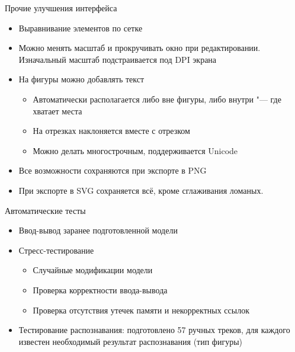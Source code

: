 \documentclass[utf8,xcolor=table]{beamer}
\begin{document}
\begin{frame}[t]{Прочие улучшения интерфейса}
  \begin{itemize}
  \item Выравнивание элементов по сетке
  \item Можно менять масштаб и прокручивать окно при редактировании. Изначальный масштаб подстраивается под DPI экрана
  \item На фигуры можно добавлять текст
    \begin{itemize}
    \item Автоматически располагается либо вне фигуры, либо внутри "--- где хватает места
    \item На отрезках наклоняется вместе с отрезком
    \item Можно делать многострочным, поддерживается Unicode
    \end{itemize}
  \item Все возможности сохраняются при экспорте в PNG
  \item При экспорте в SVG сохраняется всё, кроме сглаживания ломаных.
  \end{itemize}
\end{frame}

\begin{frame}[t]{Автоматические тесты}
  \begin{itemize}
  \item Ввод-вывод заранее подготовленной модели
  \item Стресс-тестирование
    \begin{itemize}
    \item Случайные модификации модели
    \item Проверка корректности ввода-вывода
    \item Проверка отсутствия утечек памяти и некорректных ссылок
    \end{itemize}
  \item Тестирование распознавания: подготовлено 57 ручных треков, для каждого известен необходимый результат распознавания (тип фигуры)
  \end{itemize}
\end{frame}
\end{document}
